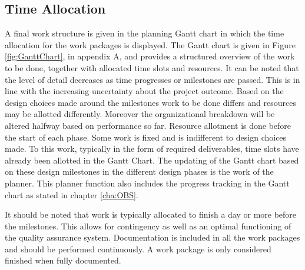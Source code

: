 \subsection{Time Allocation}\label{sec:timeallocation}

A final work structure is given in the planning Gantt chart in which the time allocation for the work packages is displayed. The Gantt chart is given in Figure \ref{fig:GanttChart}, in appendix A, and provides a structured overview of the work to be done, together with allocated time slots and resources. It can be noted that the level of detail decreases as time progresses or milestones are passed. This is in line with the increasing uncertainty about the project outcome. Based on the design choices made around the milestones work to be done differs and resources may be allotted differently. Moreover the organizational breakdown will be altered halfway based on performance so far. Resource allotment is done before the start of each phase. Some work is fixed and is indifferent to design choices made. To this work, typically in the form of required deliverables, time slots have already been allotted in the Gantt Chart. The updating of the Gantt chart based on these design milestones in the different design phases is the work of the planner. This planner function also includes the progress tracking in the Gantt chart as stated in chapter \ref{cha:OBS}.

It should be noted that work is typically allocated to finish a day or more before the milestones. This allows for contingency as well as an optimal functioning of the quality assurance system. Documentation is included in all the work packages and should be performed continuously. A work package is only considered finished when fully documented.


